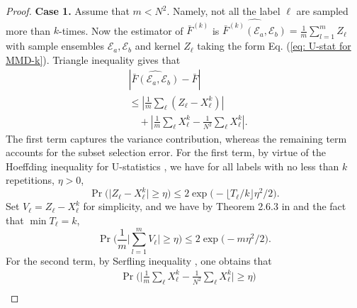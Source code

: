 \documentclass[aps,prx,reprint,superscriptaddress,amsmath,amssymb,longbibliography,floatfix]{revtex4-2}
\newcommand{\norm}[1]{\left \lVert #1 \right \rVert}
\newcommand{\abs}[1]{\lvert #1\rvert}
\newcommand{\Abs}[1]{\left\lvert #1\right\rvert}
\newcommand{\scE}{\mathcal{E}}
\theoremstyle{plain}
\theoremstyle{definition}
\theoremstyle{remark}
\begin{document}
\begin{proof}
    \textbf{Case 1.} Assume that $m< N^2$. Namely, not all the label $\ell$ are sampled more than $k$-times.
    Now the estimator of $\bar{F}^{(k)}$ is $\widehat{\bar{F}^{(k)}(\scE_a,\scE_b)} = \frac{1}{m}\sum _{l=1}^m Z_{\ell}$ with sample ensembles $\scE_a, \scE_b$ and kernel $Z_{\ell}$ taking the form Eq. (\ref{eq: U-stat for MMD-k}). Triangle inequality gives that
    \begin{equation}
\begin{aligned}
&\left|\widehat{\bar{F}(\scE_a,\scE_b)} - \bar{F} \right| \\
&\leq
    \left| \frac{1}{m}\sum_{\ell} (Z_{\ell}-X_{\ell}^k) \right|\\
&\quad+ \Abs{\frac{1}{m}\sum_{\ell}X_{\ell}^k - \frac{1}{N^2}\sum_{\ell} X_{\ell}^k}.
\end{aligned}
\label{eq:app-local-mmd-error-decomposition}
\end{equation} 
    The first term captures the variance contribution, whereas the remaining term accounts for the subset selection error. For the first term, by virtue of the Hoeffding inequality for U-statistics \cite{Lee_U_statistics_19}, we have for all labels with no less than $k$ repetitions, $\eta>0$,
    \begin{equation}\label{eq: Hoeffding for each label}
        \Pr  \big(\abs{Z_{\ell}-X_{\ell}^k}\ge\eta \big) \leq 2 \exp \big(-\lfloor T_{\ell}/k\rfloor \eta^2/2 \big).
    \end{equation}
    Set $V_{\ell}=Z_{\ell}-X_{\ell}^k$ for simplicity, and we have by Theorem 2.6.3 in \cite{Vershynin_high_dimensional_probability} and the fact that $\min T_\ell  = k$,
    \begin{equation}\label{eq: general Hoeffding of mA}
        \Pr \big(\frac{1}{m}\abs{\sum_{l=1}^{m} V_{\ell}} \ge\eta\big) \leq 2\exp \big(- m \eta^2/2 \big). 
    \end{equation}
    For the second term, by Serfling inequality \cite{Serfling_10.1214/aos/1176342611}, one obtains that
    \begin{equation}
\begin{aligned}
\label{eq: general Hoeffding of mB}
&
        \Pr  \Big( \abs{\frac{1}{m}\sum_{\ell}X_{\ell}^k - \frac{1}{N^2}\sum_{\ell} X_{\ell}^k} \ge\eta\Big) \\

\end{aligned}
\end{equation}
\end{proof}
\end{document}
